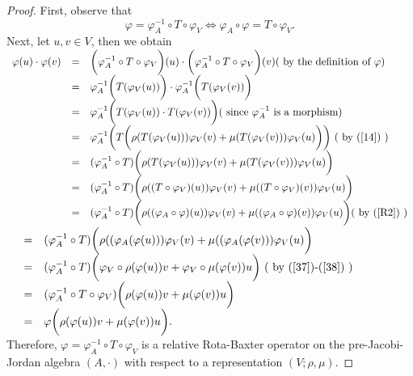 \documentclass[12pt]{amsart}
\begin{document}
\begin{proof}  First, observe that
	\begin{equation}
		\varphi=\varphi_A^{-1}\circ T\circ\varphi_V\iff \varphi_A\circ \varphi=T\circ \varphi_V. 
		\label{R2}
	\end{equation}
Next, let $ u,v\in V$, then we obtain\\
	$ \begin{array}{lll}
	\varphi(u)\cdot\varphi(v)&=&\bigg(\varphi_A^{-1}\circ T\circ\varphi_V\bigg)(u)\cdot \bigg(\varphi_A^{-1}\circ T\circ\varphi_V\bigg)(v)  \mbox{( by the definition of $ \varphi$)} \\
	&=&\varphi_A^{-1}\bigg(T(\varphi_{V}(u))\bigg)\cdot\varphi_A^{-1}\bigg(T(\varphi_{V}(v))\bigg)\\
	&=&\varphi_A^{-1}\bigg(T(\varphi_{V}(u))\cdot T(\varphi_{V}(v))\bigg)(\text{ since $ \varphi_A^{-1} $ is a morphism})\\
	&=&\varphi_A^{-1}\bigg(T\bigg(\rho(T(\varphi_{V}(u)))\varphi_{V}(v)+\mu(T(\varphi_{V}(v)))\varphi_{V}(u)\bigg)\bigg)\mbox{ ( by $ (\ref{14})$ )}\\
	&=&(\varphi_A^{-1}\circ T)\bigg(\rho(T(\varphi_{V}(u)))\varphi_{V}(v)+\mu(T(\varphi_{V}(v)))\varphi_{V}(u)\bigg)\\
	&=&(\varphi_A^{-1}\circ T)\bigg(\rho((T\circ\varphi_{V})(u))\varphi_{V}(v)+\mu((T\circ\varphi_{V})(v))\varphi_{V}(u)\bigg)\\
	&=&(\varphi_A^{-1}\circ T)\bigg(\rho((\varphi_A\circ\varphi)(u))\varphi_{V}(v)+\mu((\varphi_A\circ\varphi)(v))\varphi_{V}(u)\bigg) \mbox{( by (\ref{R2}) )}\\
\end{array} $\\
$ \begin{array}{lll}
	&=&(\varphi_A^{-1}\circ T)\bigg(\rho((\varphi_A(\varphi(u)))\varphi_{V}(v)+\mu((\varphi_A(\varphi(v)))\varphi_{V}(u)\bigg) \\
	&=&(\varphi_A^{-1}\circ T)\bigg(\varphi_{V}\circ\rho(\varphi(u))v+\varphi_{V}\circ\mu(\varphi(v))u\bigg)\mbox{ ( by (\ref{37})-(\ref{38}) )} \\
	&=&(\varphi_A^{-1}\circ T\circ \varphi_{V})\bigg(\rho(\varphi(u))v+\mu(\varphi(v))u\bigg)\\
	&=&\varphi\bigg(\rho(\varphi(u))v+\mu(\varphi(v))u\bigg).
	\end{array} $ \\
	Therefore, $	\varphi=\varphi_A^{-1}\circ T\circ\varphi_V$ 
	is a relative Rota-Baxter operator  on the pre-Jacobi-Jordan algebra $(A,\cdot)$ with
	respect to a representation $(V;\rho,\mu)$. 
\end{proof}
\end{document}
